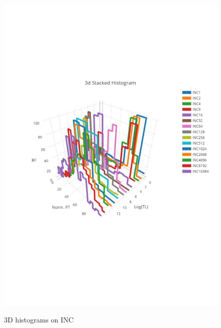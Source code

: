 \begin{figure}[htp!]
	\centering
	\includegraphics[scale=1]{u_s_time/new_3d_plot}\label{fig:3d_plot}
	\caption{3D histograms on INC~\label{fig:hist3d}}
\end{figure}

